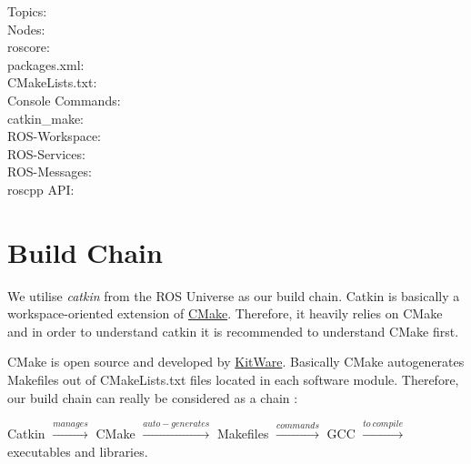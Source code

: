 \begin{description}
  \item [Topics:]
  \item [Nodes:]
  \item [roscore:]
  \item [packages.xml:]
  \item [CMakeLists.txt:]
  \item [Console Commands:]
  \item [catkin\_make:]
  \item [ROS-Workspace:] 
  \item [ROS-Services:]
  \item [ROS-Messages:]
  \item [roscpp API:]
\end{description}


\section{Build Chain}
\label{sec:BuildChain}

We utilise \emph{catkin} from the ROS Universe as our build chain. Catkin is basically a workspace-oriented extension of \href{http://www.cmake.org/}{CMake}. Therefore, it heavily relies on CMake and in order to understand catkin it is recommended to understand CMake first.

CMake is open source and developed by \href{http://www.kitware.com/company/about.html}{KitWare}. Basically CMake autogenerates Makefiles out of CMakeLists.txt files located in each software module. Therefore, our build chain can really be considered as a chain \smiley: 

Catkin $\xrightarrow{manages}$ CMake $\xrightarrow{auto-generates}$ Makefiles $\xrightarrow{commands}$ GCC $\xrightarrow{to\ compile}$ executables and libraries.
